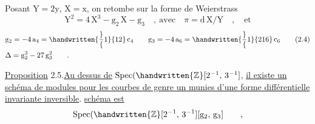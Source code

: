 Posant $\mathrm{Y}=2\mathrm{y}$, $\mathrm{X}=\mathrm{x}$, on retombe sur la forme de Weierstrass
\[
\mathrm{Y}^{2}=4\,\mathrm{X}^{3}-\mathrm{g}_{2}\,\mathrm{X}-\mathrm{g}_{3}\quad,\ \text{avec}\quad\pi=\mathrm{d}\,\mathrm{X}/\mathrm{Y}\quad,\quad\text{et}
\tag*{(2.3)}
\]
\[
\begin{aligned}[t]
&\mathrm{g}_{2}=-4\,\mathrm{a}_{4}=\handwritten{\frac}{1}{12}\,\mathrm{c}_{4}\qquad
\mathrm{g}_{3}=-4\,\mathrm{a}_{6}=\handwritten{\frac}{1}{216}\,\mathrm{c}_{6}\\
&\Delta=\mathrm{g}_{2}^{3}-27\,\mathrm{g}_{3}^{2}\qquad.
\end{aligned}
\tag*{(2.4)}
\]

\uline{Proposition} 2.5.\quad \uline{Au dessus de} $\operatorname{Spec}(\handwritten{\mathbb{Z}}[2^{-1},\,3^{-1}]$, \uline{il existe un schéma de modules pour les courbes de genre un munies d'une forme différentielle invariante inversible}. \uline{ schéma est}
\[
\operatorname{Spec}(\handwritten{\mathbb{Z}}[2^{-1},\,3^{-1}][\mathrm{g}_{2},\,\mathrm{g}_{3}]\qquad,
\]
\clearpage
